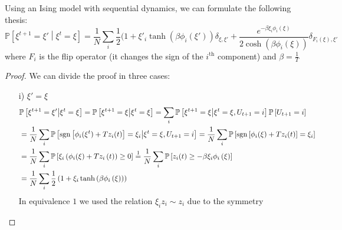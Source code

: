 \begin{lemma}
    \label{lemma:stoch_der}
    Using an Ising model with sequential dynamics, we can formulate the following thesis:
    \[
        \mathbb{P}\left[\xi^{t+1}=\xi'\middle|\xi^t=\xi\right] =
        \frac{1}{N}\sum_i \frac{1}{2} (1 + \xi'_i \tanh(\beta \phi_i(\xi' )) \delta_{\xi,\xi'} + \frac{e^{-\beta \xi_i \phi_i(\xi)}}{2\cosh(\beta\phi_i(\xi))} \delta_{F_i(\xi),\xi'}
    \]
    where $F_i $ is the flip operator (it changes the sign of the $i^{\text{th}}$ component) and $\beta = \frac{1}{T}$
    \begin{proof}
    We can divide the proof in three cases:
    \begin{itemize}
        \item[i)] $\xi' = \xi$
        \begin{align*}
            &\mathbb{P}\left[\xi^{t+1}=\xi'\middle|\xi^t=\xi\right]
            = \mathbb{P}\left[\xi^{t+1}=\xi\middle|\xi^t=\xi\right]
            = \sum_i \mathbb{P}\left[\xi^{t+1}=\xi\middle|\xi^t=\xi, U_{t+1}=i\right]\mathbb{P}\left[U_{t+1}=i\right] \\
            &= \frac1N \sum_i \mathbb{P}\left[ \operatorname{sgn}\left[\phi_i(\xi^t) + Tz_i(t) \right] = \xi_i\middle|\xi^t=\xi, U_{t+1}=i\right]
            = \frac1N \sum_i \mathbb{P}\left[ \operatorname{sgn}\left[\phi_i(\xi) + Tz_i(t) \right] = \xi_i\right] \\
            &= \frac1N \sum_i \mathbb{P}\left[ \xi_i\left(\phi_i(\xi) + Tz_i\left(t\right) \right) \geq 0 \right]
            \overset{1}{=} \frac1N \sum_i \mathbb{P}\left[z_i(t) \geq - \beta \xi_i \phi_i\left(\xi\right) \right] \\
            &= \frac1N \sum_i \frac12 \left(1 + \xi_i \tanh\left(\beta \phi_i\left(\xi\right)\right)\right)
        \end{align*}
        In equivalence $1$ we used the relation $\xi_i z_i \sim z_i$ due to the symmetry


\end{itemize}
\end{proof}
\end{lemma}
